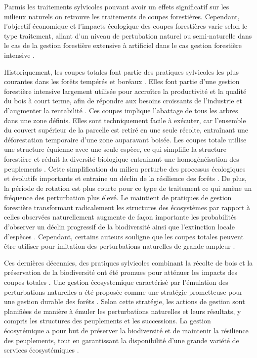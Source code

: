 Parmis les traitements sylvicoles pouvant avoir un effets significatif sur les milieux naturels on retrouve les traitements de coupes forestières.
Cependant, l'objectif économique et l'impacts écologique des coupes forestières varie selon le type traitement, allant d'un niveau de pertubation naturel ou semi-naturelle dans le cas de la gestion forestière extensive à artificiel dans le cas gestion forestière intensive \citep{Ameray2021Forestcarbon}. 

Historiquement, les coupes totales font partie des pratiques sylvicoles les plus courantes dans les forêts tempérés et boréaux \citep{Fedrowitz2014Canretention,Chaudhary2016Impactforest}. 
Elles font partie d'une gestion forestière intensive largement utilisée pour accroître la productivité et la qualité du bois à court terme, afin de répondre aux besoins croissants de l'industrie et d'augmenter la rentabilité \citep{Irland2011TimberProductivitya}.
Ces coupes implique l'abattage de tous les arbres dans une zone définis.
Elles sont techniquement facile à exécuter, car l'ensemble du couvert supérieur de la parcelle est retiré en une seule récolte, entraînant une déforestation temporaire d'une zone auparavant boisée. 
Les coupes totale utilise une structure équienne avec une seule espèce, ce qui simplifie la structure forestière et réduit la diversité biologique entrainant une homogénéisation des peuplements \citep{Rosenvald2008whatwhen}. 
Cette simplification du milieu perturbe des processus écologiques et évolutifs importants et entraine un déclin de la résilience des forêts \citep{Holling2001UnderstandingComplexity}. 
De plus, la période de rotation est plus courte pour ce type de traitement ce qui amène un fréquence des perturbation plus élevé. 
Le maintient de pratiques de gestion forestière transformant radicalement les structures des écosystèmes par rapport à celles observées naturellement augmente de façon importante les probabilités d'observer un déclin progressif de la biodiversité ainsi que l'extinction locale d'espèces \citep{Hanski2000Extinctiondebt}.  
Cependant, certains auteurs souligne que les coupes totales peuvent être utiliser pour imitation des perturbations naturelles de grande ampleur \citep{Greenberg1995comparisonbird}. 

Ces dernières décennies, des pratiques sylvicoles combinant la récolte de bois et la préservation de la biodiversité ont été promues pour atténuer les impacts des coupes totales \citep{Gustafsson2012Retentionforestry}.
Une gestion écosystemique caractérisé par l'émulation des perturbations naturelles a été proposée comme une stratégie prometteuse pour une gestion durable des forêts \citep{Perry1998scientificbasis,Kuuluvainen2002Naturalvariabilitya}. 
Selon cette stratégie, les actions de gestion sont planifiées de manière à émuler les perturbations naturelles et leurs résultats, y compris les structures des peuplements et les successions. 
La gestion écosytémique a pour but de préserver la biodiversité et de maintenir la résilience des peuplements, tout en garantissant la disponibilité d'une grande variété de services écosystémiques \citep{Szaro1998emergenceecosystem,MacDicken2015Globalprogress}.

